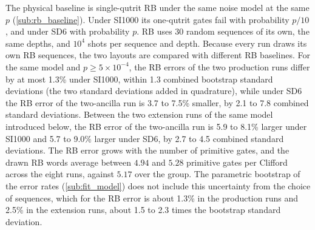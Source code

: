 The physical baseline is single-qutrit RB under the same noise model at the same $p$ (\autoref{sub:rb_baseline}). Under SI1000 its one-qutrit gates fail with probability $p/10$, and under SD6 with probability $p$. RB uses 30 random sequences of its own, the same depths, and $10^4$ shots per sequence and depth. Because every run draws its own RB sequences, the two layouts are compared with different RB baselines. For the same model and $p \ge 5\times10^{-4}$, the RB errors of the two production runs differ by at most 1.3\% under SI1000, within 1.3 combined bootstrap standard deviations (the two standard deviations added in quadrature), while under SD6 the RB error of the two-ancilla run is 3.7 to 7.5\% smaller, by 2.1 to 7.8 combined standard deviations. Between the two extension runs of the same model introduced below, the RB error of the two-ancilla run is 5.9 to 8.1\% larger under SI1000 and 5.7 to 9.0\% larger under SD6, by 2.7 to 4.5 combined standard deviations. The RB error grows with the number of primitive gates, and the drawn RB words average between $4.94$ and $5.28$ primitive gates per Clifford across the eight runs, against $5.17$ over the group. The parametric bootstrap of the error rates (\autoref{sub:fit_model}) does not include this uncertainty from the choice of sequences, which for the RB error is about 1.3\% in the production runs and 2.5\% in the extension runs, about 1.5 to 2.3 times the bootstrap standard deviation.

